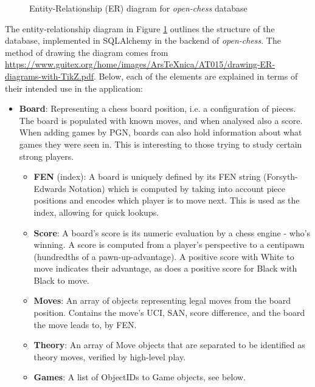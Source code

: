 \documentclass[architecture.tex]{subfiles}
\begin{document}
\begin{figure}[H]

\caption{Entity-Relationship (ER) diagram for \textit{open-chess} database}
\label{fig:er-diagram}
\end{figure}

The entity-relationship diagram in Figure \ref{fig:er-diagram} outlines the structure of the 
database, implemented in SQLAlchemy in the backend of \textit{open-chess}.
The method of drawing the diagram comes from 
\url{https://www.guitex.org/home/images/ArsTeXnica/AT015/drawing-ER-diagrams-with-TikZ.pdf}.
Below, each of the elements are explained in terms of their intended
use in the application:

\begin{itemize}
    \item \textbf{Board}: Representing a chess board position, i.e. a configuration
        of pieces. The board is populated with known moves, and when analysed
        also a score. When adding games by PGN, boards can also hold information
        about what games they were seen in. This is interesting to those trying
        to study certain strong players.
        \begin{itemize}
            \item \textbf{FEN} (index): A board is uniquely defined
                by its FEN string (Forsyth-Edwards Notation)
                which is computed by taking into account piece positions and encodes
                which player is to move next.
                This is used as the index, allowing for quick lookups.
            \item \textbf{Score}: A board's score is its numeric evaluation by a chess
                engine - who's winning. A score is computed from a player's 
                perspective to a centipawn (hundredths of a pawn-up-advantage).
                A positive score with White to move indicates their advantage,
                as does a positive score for Black with Black to move.
            \item \textbf{Moves}: An array of objects representing legal moves from the
                board position. Contains the move's UCI, SAN, score difference,
                and the board the move leads to, by FEN.
            \item \textbf{Theory}: An array of Move objects that are separated to
                be identified as theory moves, verified by high-level play.
            \item \textbf{Games}: A list of ObjectIDs to Game objects, see below.

\end{itemize}
\end{itemize}
\end{document}
